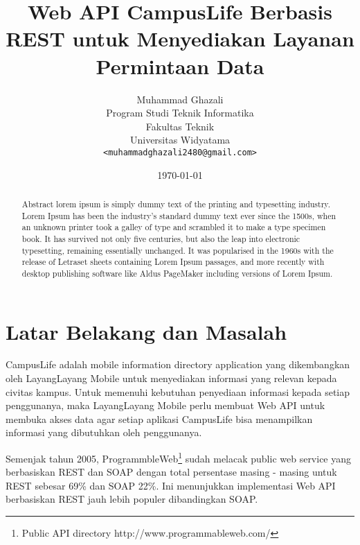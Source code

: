 \documentclass[a4paper, 12pt]{report}
\title{\textbf{Web API CampusLife Berbasis REST untuk Menyediakan Layanan Permintaan Data}}
\author{
Muhammad Ghazali\\
Program Studi Teknik Informatika\\
Fakultas Teknik\\
Universitas Widyatama
\\ \texttt{<muhammadghazali2480@gmail.com>}
}
\date{\today}
\begin{document}
\maketitle

\tableofcontents
\setcounter{tocdepth}{3}

\listoffigures
\listoftables

\begin{abstract}
Abstract lorem ipsum is simply dummy text of the printing and typesetting industry. Lorem Ipsum has been the industry's standard dummy text ever since the 1500s, when an unknown printer took a galley of type and scrambled it to make a type specimen book. It has survived not only five centuries, but also the leap into electronic typesetting, remaining essentially unchanged. It was popularised in the 1960s with the release of Letraset sheets containing Lorem Ipsum passages, and more recently with desktop publishing software like Aldus PageMaker including versions of Lorem Ipsum.
\end{abstract}

\section*{Latar Belakang dan Masalah}
CampusLife adalah mobile information directory application yang dikembangkan oleh LayangLayang Mobile untuk menyediakan informasi yang relevan kepada civitas kampus. Untuk memenuhi kebutuhan penyediaan informasi kepada setiap penggunanya, maka LayangLayang Mobile perlu membuat Web API untuk membuka akses data agar setiap aplikasi CampusLife bisa menampilkan informasi yang dibutuhkan oleh penggunanya.

Semenjak tahun 2005, ProgrammbleWeb\footnote{Public API directory http://www.programmableweb.com/} sudah melacak public web service yang berbasiskan REST dan SOAP dengan total persentase masing - masing untuk REST sebesar 69\% dan SOAP 22\%. Ini menunjukkan implementasi Web API berbasiskan REST jauh lebih populer dibandingkan SOAP.\cite{programmableweb-apis}
\end{document}
